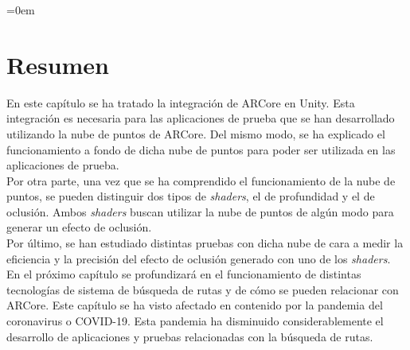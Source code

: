 \parindent=0em
\section*{Resumen}
\noindent

En este capítulo se ha tratado la integración de ARCore en Unity. Esta integración es necesaria para las aplicaciones de prueba que se han desarrollado utilizando la nube de puntos de ARCore. Del mismo modo, se ha explicado el funcionamiento a fondo de dicha nube de puntos para poder ser utilizada en las aplicaciones de prueba.\\

Por otra parte, una vez que se ha comprendido el funcionamiento de la nube de puntos, se pueden distinguir dos tipos de \textit{shaders}, el de profundidad y el de oclusión. Ambos \textit{shaders} buscan utilizar la nube de puntos de algún modo para generar un efecto de oclusión.\\

Por último, se han estudiado distintas pruebas con dicha nube de cara a medir la eficiencia y la precisión del efecto de oclusión generado con uno de los \textit{shaders}.\\

En el próximo capítulo se profundizará en el funcionamiento de distintas tecnologías de sistema de búsqueda de rutas y de cómo se pueden relacionar con ARCore. Este capítulo se ha visto afectado en contenido por la pandemia del coronavirus o COVID-19. Esta pandemia ha disminuido considerablemente el desarrollo de aplicaciones y pruebas relacionadas con la búsqueda de rutas.
